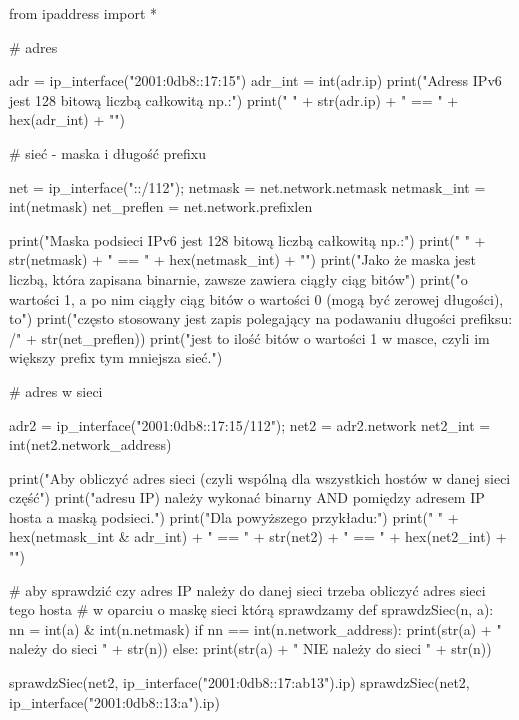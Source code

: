 \label{czy_w_sieci_kod}\begin{CodeFrame*}[python][fontsize=\footnotesize]{}
from ipaddress import *

# adres

adr     = ip_interface("2001:0db8::17:15")
adr_int = int(adr.ip)
print("Adress IPv6 jest 128 bitową liczbą całkowitą np.:")
print("  " + str(adr.ip) + " == " + hex(adr_int) + "\n")

# sieć - maska i długość prefixu

net         = ip_interface("::/112");
netmask     = net.network.netmask
netmask_int = int(netmask)
net_preflen = net.network.prefixlen

print("Maska podsieci IPv6 jest 128 bitową liczbą całkowitą np.:")
print("  " + str(netmask) + " == " + hex(netmask_int) + "\n")
print("Jako że maska jest liczbą, która zapisana binarnie, zawsze zawiera ciągły ciąg bitów")
print("o wartości 1, a po nim ciągły ciąg bitów o wartości 0 (mogą być zerowej długości), to")
print("często stosowany jest zapis polegający na podawaniu długości prefiksu: /" + str(net_preflen))
print("jest to ilość bitów o wartości 1 w masce, czyli im większy prefix tym mniejsza sieć.\n")

# adres w sieci

adr2     = ip_interface("2001:0db8::17:15/112");
net2     = adr2.network
net2_int = int(net2.network_address)

print("Aby obliczyć adres sieci (czyli wspólną dla wszystkich hostów w danej sieci część")
print("adresu IP) należy wykonać binarny AND pomiędzy adresem IP hosta a maską podsieci.")
print("Dla powyższego przykładu:")
print("  " + hex(netmask_int & adr_int) + " == " + str(net2) + " == " + hex(net2_int) + "\n")

# aby sprawdzić czy adres IP należy do danej sieci trzeba obliczyć adres sieci tego hosta
# w oparciu o maskę sieci którą sprawdzamy
def sprawdzSiec(n, a):
	nn = int(a) & int(n.netmask)
	if nn == int(n.network_address):
		print(str(a) + " należy do sieci " + str(n))
	else:
		print(str(a) + " NIE należy do sieci " + str(n))

sprawdzSiec(net2, ip_interface("2001:0db8::17:ab13").ip)
sprawdzSiec(net2, ip_interface("2001:0db8::13:a").ip)
\end{CodeFrame*}
